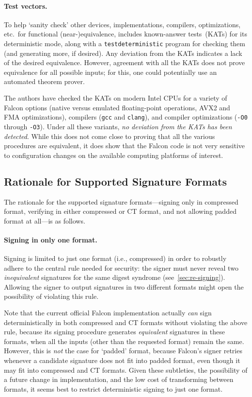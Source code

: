 \documentclass[11pt]{article}
\begin{document}
\paragraph{Test vectors.}

To help `sanity check' other devices, implementations, compilers,
optimizations, etc.\ for functional (near-)equivalence, \fd includes
known-answer tests~(KATs) for its deterministic mode, along with a
\texttt{test\textunderscore deterministic} program for checking them
(and generating more, if desired). Any deviation from the KATs
indicates a lack of the desired equivalence. However, agreement with
all the KATs does not prove equivalence for all possible inputs; for
this, one could potentially use an automated theorem prover.

The authors have checked the KATs on modern Intel CPUs for a variety
of Falcon options (native versus emulated floating-point operations,
AVX2 and FMA optimizations), compilers (\texttt{gcc} and
\texttt{clang}), and compiler optimizations (\texttt{-O0} through
\texttt{-O3}). Under all these variants, \emph{no deviation from the
  KATs has been detected}. While this does not come close to proving
that all the various procedures are equivalent, it does show that the
Falcon code is not very sensitive to configuration changes on the
available computing platforms of interest.

\subsection{Rationale for Supported Signature Formats}
\label{sec:rationale-formats}

The rationale for the supported signature formats---signing only in
compressed format, verifying in either compressed or CT format, and
not allowing padded format at all---is as follows.

\paragraph{Signing in only one format.}

Signing is limited to just one format (i.e., compressed) in order to
robustly adhere to the central rule needed for security: the signer
must never reveal two \emph{inequivalent} signatures for the same
digest syndrome (see~\cref{sec:re-signing}). Allowing the signer to
output signatures in two different formats might open the possibility
of violating this rule.

Note that the current official Falcon implementation actually
\emph{can} sign deterministically in both compressed and CT formats
without violating the above rule, because its signing procedure
generates \emph{equivalent} signatures in these formats, when all the
inputs (other than the requested format) remain the same. However,
this is \emph{not} the case for `padded' format, because Falcon's
signer retries whenever a candidate signature does not fit into padded
format, even though it may fit into compressed and CT formats. Given
these subtleties, the possibility of a future change in
implementation, and the low cost of transforming between formats, it
seems best to restrict deterministic signing to just one format.
\end{document}

